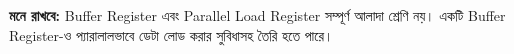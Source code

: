 \par\begingroup

\textbf{মনে রাখবে:}
\textenglish{Buffer Register} এবং
\textenglish{Parallel Load Register} সম্পূর্ণ আলাদা শ্রেণি নয়।
একটি \textenglish{Buffer Register}-ও প্যারালালভাবে ডেটা লোড করার
সুবিধাসহ তৈরি হতে পারে।
\par\endgroup




